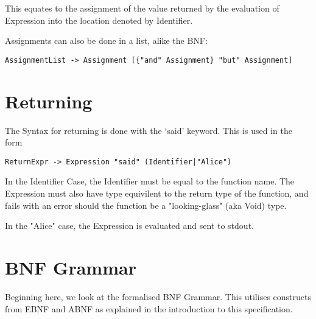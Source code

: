 \documentclass[a4wide, 11pt]{article}
\begin{document}
This equates to the assignment of the value returned by the evaluation of Expression into the location denoted by Identifier.

Assignments can also be done in a list, alike the BNF:
\begin{verbatim}
AssignmentList -> Assignment [{"and" Assignment} "but" Assignment]
\end{verbatim}

\section {Returning}

The Syntax for returning is done with the `said' keyword. This is used in the form
\begin{verbatim}
ReturnExpr -> Expression "said" (Identifier|"Alice")
\end{verbatim}
In the Identifier Case, the Identifier must be equal to the function name. The Expression must also have type equivilent to the return type of the function, and fails with an error should the function be a "looking-glass" (aka Void) type.

In the "Alice" case, the Expression is evaluated and sent to stdout.

\section{BNF Grammar} 

Beginning here, we look at the formalised BNF Grammar. This utilises constructs from EBNF and ABNF as explained in the introduction to this specification.
\end{document}
